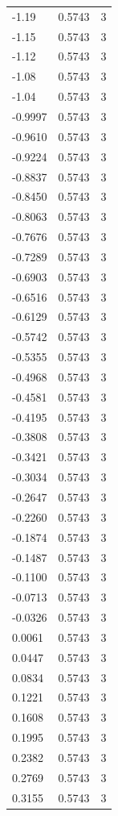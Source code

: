 \begin{longtable}{lrr}
  -1.19 & 0.5743 & 3 \\
  -1.15 & 0.5743 & 3 \\
  -1.12 & 0.5743 & 3 \\
  -1.08 & 0.5743 & 3 \\
  -1.04 & 0.5743 & 3 \\
  -0.9997 & 0.5743 & 3 \\
  -0.9610 & 0.5743 & 3 \\
  -0.9224 & 0.5743 & 3 \\
  -0.8837 & 0.5743 & 3 \\
  -0.8450 & 0.5743 & 3 \\
  -0.8063 & 0.5743 & 3 \\
  -0.7676 & 0.5743 & 3 \\
  -0.7289 & 0.5743 & 3 \\
  -0.6903 & 0.5743 & 3 \\
  -0.6516 & 0.5743 & 3 \\
  -0.6129 & 0.5743 & 3 \\
  -0.5742 & 0.5743 & 3 \\
  -0.5355 & 0.5743 & 3 \\
  -0.4968 & 0.5743 & 3 \\
  -0.4581 & 0.5743 & 3 \\
  -0.4195 & 0.5743 & 3 \\
  -0.3808 & 0.5743 & 3 \\
  -0.3421 & 0.5743 & 3 \\
  -0.3034 & 0.5743 & 3 \\
  -0.2647 & 0.5743 & 3 \\
  -0.2260 & 0.5743 & 3 \\
  -0.1874 & 0.5743 & 3 \\
  -0.1487 & 0.5743 & 3 \\
  -0.1100 & 0.5743 & 3 \\
  -0.0713 & 0.5743 & 3 \\
  -0.0326 & 0.5743 & 3 \\
  0.0061 & 0.5743 & 3 \\
  0.0447 & 0.5743 & 3 \\
  0.0834 & 0.5743 & 3 \\
  0.1221 & 0.5743 & 3 \\
  0.1608 & 0.5743 & 3 \\
  0.1995 & 0.5743 & 3 \\
  0.2382 & 0.5743 & 3 \\
  0.2769 & 0.5743 & 3 \\
  0.3155 & 0.5743 & 3 \\

\end{longtable}
